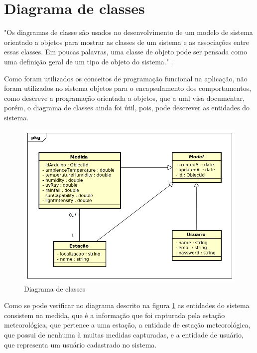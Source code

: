 \section{Diagrama de classes}

"Os diagramas de classe são usados no desenvolvimento de um modelo de sistema orientado a objetos para mostrar as classes de um sistema e as associações entre essas classes. Em poucas palavras, uma classe de objeto pode ser pensada como uma definição geral de um tipo de objeto do sistema." \cite{engenharia_software_sommerville}.

Como foram utilizados os conceitos de programação funcional na aplicação, não foram utilizados no sistema objetos para o encapsulamento dos comportamentos, como descreve a programação orientada a objetos, que a uml visa documentar, porém, o diagrama de classes ainda foi útil, pois, pode descrever as entidades do sistema.

\begin{center}
\begin{figure}[H]
    \centering
    \caption{Diagrama de classes \label{fig:figure_diagrama_classe}}
    \includegraphics[scale=0.5]{diagrams/classe.png}
    \hfill
{}
\end{figure}
\end{center}

Como se pode verificar no diagrama descrito na figura \ref{fig:figure_diagrama_classe} as entidades do sistema consistem na medida, que é a informação que foi capturada pela estação meteorológica, que pertence a uma estação, a entidade de estação meteorológica, que possui de nenhuma à muitas medidas capturadas, e a entidade de usuário, que representa um usuário cadastrado no sistema.

